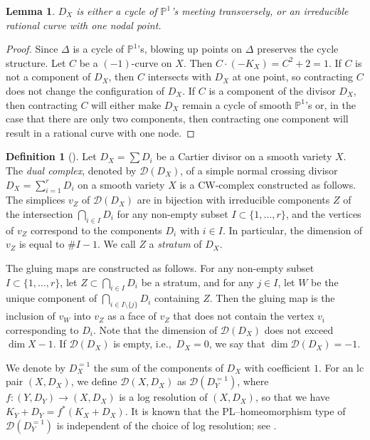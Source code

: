 \documentclass[a4paper,12pt,oneside]{amsart}
\numberwithin{equation}{section}
\newtheorem{lemma}[theorem]{Lemma}
\theoremstyle{definition}
\newtheorem{definition}[theorem]{Definition}
\theoremstyle{remark}
\newcommand{\PP}{\mathbb{P}}
\begin{document}
\begin{lemma}\label{cycle}
$D_X$ is either a cycle of $\mathbb{P}^1$'s meeting transversely, or an irreducible rational curve with one nodal point.
\end{lemma}

\begin{proof}
Since $\Delta$ is a cycle of $\PP^1$'s, blowing up points on $\Delta$ preserves the cycle structure. Let $C$ be a $(-1)$-curve on $X$. Then $C \cdot (-K_X) = C^2 + 2 = 1$. If $C$ is not a component of $D_X$, then $C$ intersects with $D_X$ at one point, so contracting $C$ does not change the configuration of $D_X$. If $C$ is a component of the divisor $D_X$, then contracting $C$ will either make $D_X$ remain a cycle of smooth $\PP^1$'s or, in the case that there are only two components, then contracting one component will result in a rational curve with one node.
\end{proof}

\begin{definition}[{\cite[Section 2.2]{loginov2024birationalinvariantsvolumepreserving}}]
Let \( D_X = \sum D_i \) be a Cartier divisor on a smooth variety \( X \).
The \emph{dual complex}, denoted by \(\mathcal{D}(D_X)\), of a simple normal crossing divisor
\( D_X = \sum_{i=1}^r D_i \) on a smooth variety \( X \) is a CW-complex constructed as follows.
The simplices \( v_Z \) of \(\mathcal{D}(D_X)\) are in bijection with irreducible components
\( Z \) of the intersection \(\bigcap_{i \in I} D_i\) for any non-empty subset
\( I \subset \{1, \ldots, r\} \), and the vertices of \( v_Z \) correspond to the components
\( D_i \) with \( i \in I \). In particular, the dimension of \( v_Z \) is equal to
\(\# I - 1\). We call \( Z \) a \emph{stratum} of \( D_X \).

The gluing maps are constructed as follows. For any non-empty subset
\( I \subset \{1, \ldots, r\} \), let \( Z \subset \bigcap_{i \in I} D_i \) be a stratum,
and for any \( j \in I \), let \( W \) be the unique component of
\(\bigcap_{i \in I \setminus \{j\}} D_i\) containing \( Z \).
Then the gluing map is the inclusion of \( v_W \) into \( v_Z \) as a face of \( v_Z \)
that does not contain the vertex \( v_i \) corresponding to \( D_i \).
Note that the dimension of \(\mathcal{D}(D_X)\) does not exceed \(\dim X - 1\).
If \(\mathcal{D}(D_X)\) is empty, i.e.,\ \( D_X = 0 \), we say that
\(\dim \mathcal{D}(D_X) = -1\).

We denote by \( D_X^{=1} \) the sum of the components of \( D_X \) with coefficient \( 1 \).
For an lc pair \((X, D_X)\), we define \(\mathcal{D}(X, D_X)\) as
\(\mathcal{D}(D_Y^{=1})\), where \( f \colon (Y, D_Y) \to (X, D_X) \) is a log resolution
of \((X, D_X)\), so that we have
$K_Y + D_Y = f^*(K_X + D_X).$ It is known that the PL–homeomorphism type of 
\(\mathcal{D}(D_Y^{=1})\) is independent of the choice of log resolution; 
see \cite[Proposition~11]{tommaso}.
\end{definition}
\end{document}
